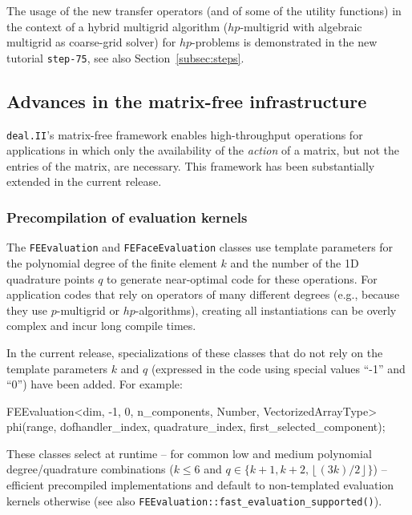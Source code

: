 \documentclass{ansarticle-preprint}
\newcommand{\specialword}[1]{\texttt{#1}}
\newcommand{\dealii}{{\specialword{deal.II}}\xspace}
\begin{document}
The usage of the new transfer operators (and of some of the utility
functions) in the context of a hybrid multigrid algorithm
($hp$-multigrid with algebraic multigrid as coarse-grid solver) for $hp$-problems is demonstrated in the new tutorial \texttt{step-75}, see also Section~\ref{subsec:steps}.



\subsection{Advances in the matrix-free infrastructure}
\label{subsec:mf}

\dealii{}'s matrix-free framework enables high-throughput operations
for applications in which only the availability of the \textit{action}
of a matrix, but not the entries of the matrix, are necessary. This
framework has been substantially extended in the current release.


\subsubsection{Precompilation of evaluation kernels}

The \texttt{FEEvaluation} and \texttt{FEFaceEvaluation} classes use template parameters for
the polynomial degree of the finite element $k$ and the number of the 1D quadrature points $q$
to generate near-optimal code for these operations.
For application codes that rely on operators of many different degrees (e.g., because
they use $p$-multigrid or $hp$-algorithms), creating all instantiations
can be overly complex and incur long compile times.

In the current release, specializations of these classes that do
not rely on the template parameters $k$ and $q$ (expressed in the code
using special values ``-1'' and ``0'') have been added. For example:
\begin{c++}
FEEvaluation<dim, -1, 0, n_components, Number, VectorizedArrayType>
  phi(range, dofhandler_index, quadrature_index, first_selected_component);
\end{c++}
These classes select at runtime -- for common low and medium
polynomial degree/quadrature combinations ($k\le 6$ and $q\in\{ k+1,
k+2, \left\lfloor (3k)/2 \right\rfloor \}$) -- efficient precompiled implementations and default to non-templated
evaluation kernels otherwise (see also \texttt{FEEvaluation::fast\_evaluation\_\allowbreak supported()}).
\end{document}
